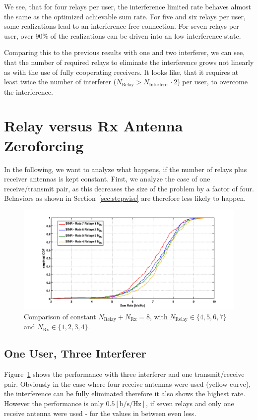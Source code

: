 We see, that for four relays per user, the interference limited rate behaves almost the same as the optimized achievable sum rate.
For five and six relays per user, some realizations lead to an interference free connection.
For seven relays per user, over 90\% of the realizations can be driven into an low interference state.

Comparing this to the previous results with one and two interferer, we can see, that  the number of required relays to eliminate the interference grows not linearly as with the use of fully cooperating receivers.
It looks like, that it requires at least twice the number of interferer ($N_\text{Relay} > N_\text{Interferer}\cdot2$) per user, to overcome the interference.

\section{Relay versus Rx Antenna Zeroforcing}
\label{sec:rel_rx_comp}

In the following, we want to analyze what happens, if the number of relays plus receiver antennas is kept constant.
First, we analyze the case of one receive/transmit pair, as this decreases the size of the problem by a factor of four.
Behaviors as shown in Section~\ref{sec:stepwise} are therefore less likely to happen.

\begin{figure}[h]
\centering
  \includegraphics[width=0.9\linewidth]{images/ConstNrelNrx8comparison_1Rx_onlySINR.png}
\caption{Comparison of constant $N_\text{Relay} + N_{\text{Rx}} = 8$, with $N_\text{Relay}\in\{4,5,6,7\}$ and $N_{\text{Rx}}\in\{1,2,3,4\}$.}
\label{fig:1user_const}
\end{figure}
\subsection{One User, Three Interferer}
\label{sec:1user_const}
Figure~\ref{fig:1user_const} shows the performance with three interferer and one transmit/receive pair.
Obviously in the case where four receive antennas were used (yellow curve), the interference can be fully eliminated therefore it also shows the highest rate.
However the performance is only $0.5 \left[\text{b/s/Hz}\right]$, if seven relays and only one receive antenna were used - for the values in between even less.

